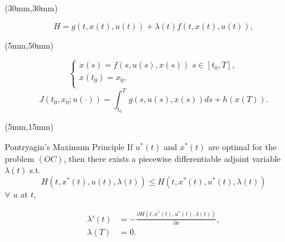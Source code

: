 \begin{frame}
	\begin{textblock*}{70mm}(30mm,30mm)
		\begin{greenbox}{}
			\begin{equation*}
			H=g(t,x(t),u(t))+\lambda(t)f(t,x(t),u(t)),
			\end{equation*}
		\end{greenbox}
	\end{textblock*}
	{
		\begin{textblock*}{120mm}(5mm,50mm)
			\begin{yellowbox}{}
				$$\left\{ \begin{array}{l}
				\dot{x}(s)=f(s,u(s),x(s))\,\,s\in [t_0,T], \\
				x(t_0)=x_0,\\
				\end{array}
				\right.$$			
				$$J(t_0,x_0;u(\cdot))=\int_{t_0}^{T}g(s,u(s),x(s))ds+h(x(T)).$$
			\end{yellowbox}
		\end{textblock*}
	}
	
\end{frame}
\begin{frame}
	\begin{textblock*}{120mm}(5mm,15mm)
		\begin{graybox}{Pontryagin’s Maximum Principle}
			If $u^*(t)$ and $x^*(t)$ are optimal for the problem $(OC)$, then there exists a piecewise differentiable adjoint variable $\lambda(t)$ s.t.
				\begin{equation*}
					H(t,x^*(t),u(t),\lambda(t))\leq H(t,x^*(t),u^*(t),\lambda(t))
				\end{equation*}
			$\forall$ $u$ at $t$,

				\begin{align*}
					\lambda'(t) &= -\frac{\partial H(t,x^*(t),u^*(t),\lambda(t))}{\partial x},\\
					\lambda(T) &= 0.
				\end{align*}
		\end{graybox}
		
	\end{textblock*}
	
\end{frame}

